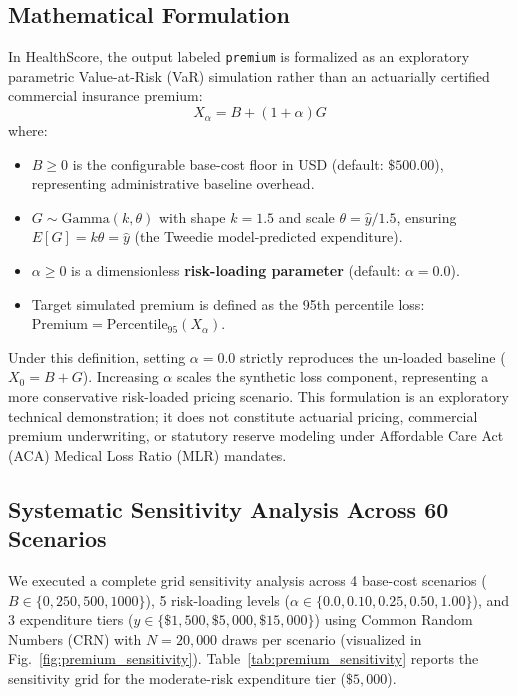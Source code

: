 \documentclass[runningheads]{llncs}
\begin{document}
\subsection{Mathematical Formulation}
In HealthScore, the output labeled \texttt{premium} is formalized as an exploratory parametric Value-at-Risk (VaR) simulation rather than an actuarially certified commercial insurance premium:
\begin{equation}
X_\alpha = B + (1 + \alpha) G
\end{equation}
where:
\begin{itemize}
    \item $B \ge 0$ is the configurable base-cost floor in USD (default: $\$500.00$), representing administrative baseline overhead.
    \item $G \sim \text{Gamma}(k, \theta)$ with shape $k = 1.5$ and scale $\theta = \hat{y} / 1.5$, ensuring $E[G] = k\theta = \hat{y}$ (the Tweedie model-predicted expenditure).
    \item $\alpha \ge 0$ is a dimensionless \textbf{risk-loading parameter} (default: $\alpha = 0.0$).
    \item Target simulated premium is defined as the 95th percentile loss: $\text{Premium} = \text{Percentile}_{95}(X_\alpha)$.
\end{itemize}

Under this definition, setting $\alpha = 0.0$ strictly reproduces the un-loaded baseline ($X_0 = B + G$). Increasing $\alpha$ scales the synthetic loss component, representing a more conservative risk-loaded pricing scenario. This formulation is an exploratory technical demonstration; it does not constitute actuarial pricing, commercial premium underwriting, or statutory reserve modeling under Affordable Care Act (ACA) Medical Loss Ratio (MLR) mandates.

\subsection{Systematic Sensitivity Analysis Across 60 Scenarios}
We executed a complete grid sensitivity analysis across 4 base-cost scenarios ($B \in \{0, 250, 500, 1000\}$), 5 risk-loading levels ($\alpha \in \{0.0, 0.10, 0.25, 0.50, 1.00\}$), and 3 expenditure tiers ($y \in \{\$1,500, \$5,000, \$15,000\}$) using Common Random Numbers (CRN) with $N = 20,000$ draws per scenario (visualized in Fig.~\ref{fig:premium_sensitivity}). Table~\ref{tab:premium_sensitivity} reports the sensitivity grid for the moderate-risk expenditure tier ($\$5,000$).
\end{document}
